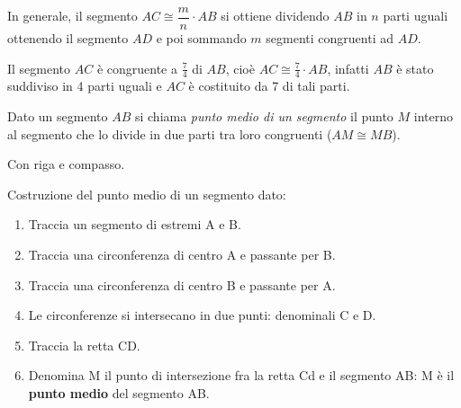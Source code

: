 In generale, il segmento \(AC\cong\dfrac{m}{n}\cdot AB\) si ottiene 
dividendo \(AB\) in \(n\) parti uguali ottenendo il segmento \(AD\) e poi 
sommando \(m\) segmenti congruenti ad \(AD\).

\begin{inaccessibleblock}
\begin{center}\end{center}
\end{inaccessibleblock}
Il segmento \(AC\) è congruente a \(\frac{7}{4}\) di \(AB\), cioè 
\(AC\cong\frac{7}{4}\cdot AB\), infatti \(AB\) è stato suddiviso in 4 parti 
uguali e \(AC\) è costituito da 7 di tali parti.

\begin{definizione}
Dato un segmento \(AB\) si chiama \emph{punto medio di un segmento} il 
punto \(M\) interno al segmento che lo divide in due parti tra loro 
congruenti (\(AM\cong MB\)).
\end{definizione}

\begin{inaccessibleblock}
\begin{center}\end{center}
\end{inaccessibleblock}

Con riga e compasso.

\begin{procedura}\label{proc:fonda_puntomedio}
  Costruzione del punto medio di un segmento dato:
  \begin{enumerate} [nosep]
    \item 
    Traccia un segmento di estremi A e B.  
    \item 
    Traccia una circonferenza di centro A e passante per B. 
    \item 
    Traccia una circonferenza di centro B e passante per A.  
    \item 
    Le circonferenze si intersecano in due punti: denominali C e D. 
    \item 
    Traccia la retta CD.
    \item 
    Denomina M il punto di intersezione fra la retta Cd e il segmento AB: M 
è 
il \textbf{punto medio} del segmento AB.
    \end{enumerate}
\end{procedura}

